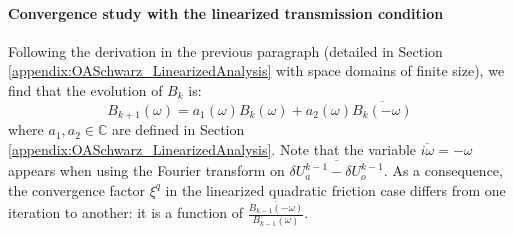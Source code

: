 \paragraph{Convergence study with the linearized transmission condition}
Following the derivation in the previous paragraph (detailed in
Section \ref{appendix:OASchwarz_LinearizedAnalysis} with
space domains of finite size),
we find that the evolution of $B_k$ is:
\begin{equation}
	\label{eq:OASchwarz_ConvergenceAnalysis_linearizedCV}
	B_{k+1}(\omega) = a_1(\omega) B_{k}(\omega) + a_2(\omega)
		\overline{B_{k}(-{\omega})}
\end{equation}
where $a_1, a_2 \in \mathbb{C}$ are defined in
Section \ref{appendix:OASchwarz_LinearizedAnalysis}.
Note that the variable $\overline{i \omega}=-\omega$ appears when using the Fourier
transform on $\overline{\delta U_a^{k-1} - \delta U_o^{k-1}}$.
As a consequence,
the convergence factor $\xi^q$ in the linearized 
quadratic friction case differs from one iteration to another:
it is a function of
$\frac{\overline{B_{k-1}(-\omega)}}{B_{k-1}(\omega)}$.

